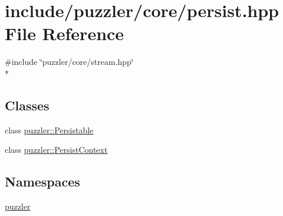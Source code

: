 \hypertarget{a00121}{}\section{include/puzzler/core/persist.hpp File Reference}
\label{a00121}
{\ttfamily \#include \char`\"{}puzzler/core/stream.\+hpp\char`\"{}}\\*
\subsection*{Classes}
\begin{DoxyCompactItemize}
\item 
class \hyperlink{a00024}{puzzler\+::\+Persistable}
\item 
class \hyperlink{a00025}{puzzler\+::\+Persist\+Context}
\end{DoxyCompactItemize}
\subsection*{Namespaces}
\begin{DoxyCompactItemize}
\item 
 \hyperlink{a00145}{puzzler}
\end{DoxyCompactItemize}
